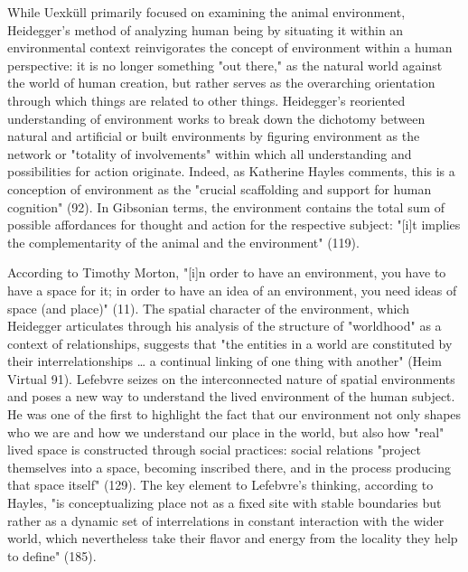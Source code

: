 \documentclass{article}
\begin{document}
While Uexküll primarily focused on examining the animal environment, Heidegger's method of analyzing human being by situating it within an environmental context reinvigorates the concept of environment within a human perspective: it is no longer something "out there," as the natural world against the world of human creation, but rather serves as the overarching orientation through which things are related to other things. Heidegger's reoriented understanding of environment works to break down the dichotomy between natural and artificial or built environments by figuring environment as the network or "totality of involvements" within which all understanding and possibilities for action originate. Indeed, as Katherine Hayles comments, this is a conception of environment as the "crucial scaffolding and support for human cognition" (92). In Gibsonian terms, the environment contains the total sum of possible affordances for thought and action for the respective subject: "[i]t implies the complementarity of the animal and the environment" (119).

According to Timothy Morton, "[i]n order to have an environment, you have to have a space for it; in order to have an idea of an environment, you need ideas of space (and place)" (11). The spatial character of the environment, which Heidegger articulates through his analysis of the structure of "worldhood" as a context of relationships, suggests that "the entities in a world are constituted by their interrelationships … a continual linking of one thing with another" (Heim Virtual 91). Lefebvre seizes on the interconnected nature of spatial environments and poses a new way to understand the lived environment of the human subject. He was one of the first to highlight the fact that our environment not only shapes who we are and how we understand our place in the world, but also how "real" lived space is constructed through social practices: social relations "project themselves into a space, becoming inscribed there, and in the process producing that space itself" (129). The key element to Lefebvre's thinking, according to Hayles, "is conceptualizing place not as a fixed site with stable boundaries but rather as a dynamic set of interrelations in constant interaction with the wider world, which nevertheless take their flavor and energy from the locality they help to define" (185).
\end{document}
